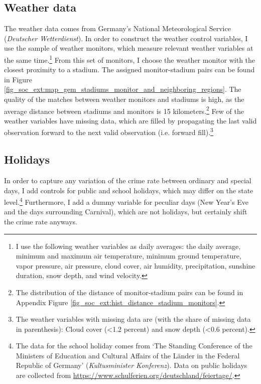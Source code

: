 \subsection{Weather data}
The weather data comes from Germany's National Meteorological Service (\textit{Deutscher Wetterdienst}). In order to construct the weather control variables, I use the sample of weather monitors, which measure relevant weather variables at the same time.\footnote{I use the following weather variables as daily averages: the daily average, minimum and maximum air temperature, minimum ground temperature, vapor pressure, air pressure, cloud cover, air humidity, precipitation, sunshine duration, snow depth, and wind velocity.} From this set of monitors, I choose the weather monitor with the closest proximity to a stadium. The assigned monitor-stadium pairs can be found in Figure \ref{fig_soc_ext:map_gem_stadiums_monitor_and_neighboring_regions}. The quality of the matches between weather monitors and stadiums is high, as the average distance between stadiums and monitors is 15 kilometers.\footnote{The distribution of the distance of monitor-stadium pairs can be found in Appendix Figure \ref{fig_soc_ext:hist_distance_stadium_monitors}.} Few of the weather variables have missing data, which are filled by propagating the last valid observation forward to the next valid observation (i.e. forward fill).\footnote{The weather variables with missing data are (with the share of missing data in parenthesis): Cloud cover (<1.2 percent) and snow depth (<0.6 percent).}



\subsection{Holidays}
In order to capture any variation of the crime rate between ordinary and special days, I add controls for public and school holidays, which may differ on the state level.\footnote{The data for the school holiday comes from `The Standing Conference of the Ministers of Education and Cultural Affairs of the Länder in the Federal Republic of Germany' (\textit{Kultusminister Konferenz}). Data on public holidays are collected from \href{https://www.schulferien.org/deutschland/feiertage/}{https://www.schulferien.org/deutschland/feiertage/}.} Furthermore, I add a dummy variable for peculiar days (New Year's Eve and the days surrounding Carnival), which are not holidays, but certainly shift the crime rate anyways.



